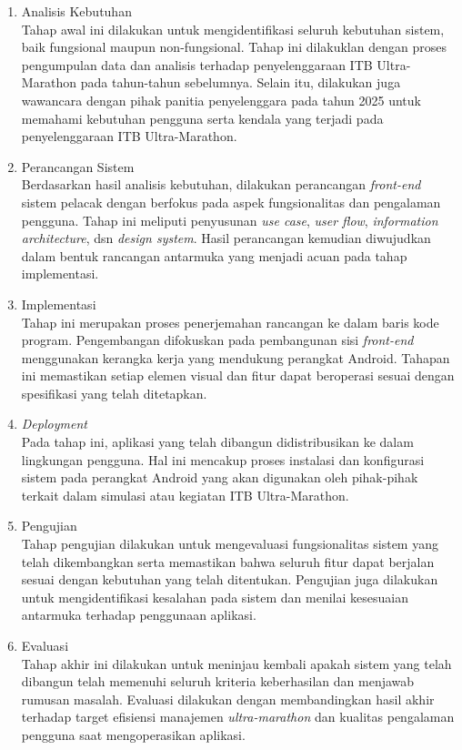 \begin{enumerate}
    \item {Analisis Kebutuhan}\\
    Tahap awal ini dilakukan untuk mengidentifikasi seluruh kebutuhan sistem, baik fungsional maupun non-fungsional. Tahap ini dilakuklan dengan proses pengumpulan data dan analisis terhadap penyelenggaraan ITB Ultra-Marathon pada tahun-tahun sebelumnya. Selain itu, dilakukan juga wawancara dengan pihak panitia penyelenggara pada tahun 2025 untuk memahami kebutuhan pengguna serta kendala yang terjadi pada penyelenggaraan ITB Ultra-Marathon.
    \item {Perancangan Sistem}\\
    Berdasarkan hasil analisis kebutuhan, dilakukan perancangan \textit{front-end} sistem pelacak dengan berfokus pada aspek fungsionalitas dan pengalaman pengguna. Tahap ini meliputi penyusunan \textit{use case}, \textit{user flow}, \textit{information architecture}, dsn \textit{design system}. Hasil perancangan kemudian diwujudkan dalam bentuk rancangan antarmuka yang menjadi acuan pada tahap implementasi.
    \item {Implementasi}\\
    Tahap ini merupakan proses penerjemahan rancangan ke dalam baris kode program. Pengembangan difokuskan pada pembangunan sisi \textit{front-end} menggunakan kerangka kerja yang mendukung perangkat Android. Tahapan ini memastikan setiap elemen visual dan fitur dapat beroperasi sesuai dengan spesifikasi yang telah ditetapkan.
    \item {\textit{Deployment}}\\
    Pada tahap ini, aplikasi yang telah dibangun didistribusikan ke dalam lingkungan pengguna. Hal ini mencakup proses instalasi dan konfigurasi sistem pada perangkat Android yang akan digunakan oleh pihak-pihak terkait dalam simulasi atau kegiatan ITB Ultra-Marathon.
     \item {Pengujian}\\
     Tahap pengujian dilakukan untuk mengevaluasi fungsionalitas sistem yang telah dikembangkan serta memastikan bahwa seluruh fitur dapat berjalan sesuai dengan kebutuhan yang telah ditentukan. Pengujian juga dilakukan untuk mengidentifikasi kesalahan pada sistem dan menilai kesesuaian antarmuka terhadap penggunaan aplikasi.
    \item {Evaluasi}\\
    Tahap akhir ini dilakukan untuk meninjau kembali apakah sistem yang telah dibangun telah memenuhi seluruh kriteria keberhasilan dan menjawab rumusan masalah. Evaluasi dilakukan dengan membandingkan hasil akhir terhadap target efisiensi manajemen \textit{ultra-marathon} dan kualitas pengalaman pengguna saat mengoperasikan aplikasi.
\end{enumerate}

